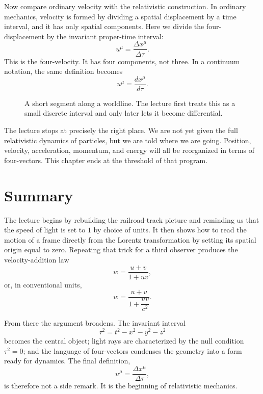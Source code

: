 Now compare ordinary velocity with the relativistic construction. In ordinary mechanics, velocity is formed by dividing a spatial displacement by a time interval, and it has only spatial components. Here we divide the four-displacement by the invariant proper-time interval:
\begin{equation}
u^\mu=\frac{\Delta x^\mu}{\Delta\tau}.
\end{equation}
This is the four-velocity. It has four components, not three. In a continuum notation, the same definition becomes
\begin{equation}
u^\mu=\frac{dx^\mu}{d\tau}.
\end{equation}

\begin{figure}[t]
\centering
{}
\caption{A short segment along a worldline. The lecture first treats this as a small discrete interval and only later lets it become differential.}
\end{figure}

The lecture stops at precisely the right place. We are not yet given the full relativistic dynamics of particles, but we are told where we are going. Position, velocity, acceleration, momentum, and energy will all be reorganized in terms of four-vectors. This chapter ends at the threshold of that program.

\section{Summary}

The lecture begins by rebuilding the railroad-track picture and reminding us that the speed of light is set to \(1\) by choice of units. It then shows how to read the motion of a frame directly from the Lorentz transformation by setting its spatial origin equal to zero. Repeating that trick for a third observer produces the velocity-addition law
\[
w=\frac{u+v}{1+uv},
\]
or, in conventional units,
\[
w=\frac{u+v}{1+\dfrac{uv}{c^2}}.
\]

From there the argument broadens. The invariant interval
\[
\tau^2=t^2-x^2-y^2-z^2
\]
becomes the central object; light rays are characterized by the null condition \(\tau^2=0\); and the language of four-vectors condenses the geometry into a form ready for dynamics. The final definition,
\[
u^\mu=\frac{\Delta x^\mu}{\Delta\tau},
\]
is therefore not a side remark. It is the beginning of relativistic mechanics.